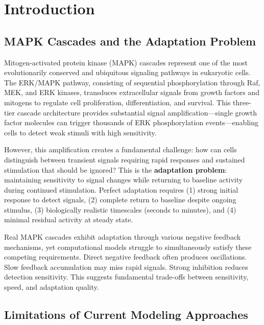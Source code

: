 \documentclass[twocolumn,11pt]{article}
\newcommand{\erk}{ERK}
\newcommand{\mapk}{MAPK}
\begin{document}
\section{Introduction}

\subsection{MAPK Cascades and the Adaptation Problem}

Mitogen-activated protein kinase (\mapk{}) cascades represent one of the most evolutionarily conserved and ubiquitous signaling pathways in eukaryotic cells. The \erk{}/\mapk{} pathway, consisting of sequential phosphorylation through Raf, MEK, and \erk{} kinases, transduces extracellular signals from growth factors and mitogens to regulate cell proliferation, differentiation, and survival. This three-tier cascade architecture provides substantial signal amplification---single growth factor molecules can trigger thousands of \erk{} phosphorylation events---enabling cells to detect weak stimuli with high sensitivity.

However, this amplification creates a fundamental challenge: how can cells distinguish between transient signals requiring rapid responses and sustained stimulation that should be ignored? This is the \textbf{adaptation problem}: maintaining sensitivity to signal changes while returning to baseline activity during continued stimulation. Perfect adaptation requires (1) strong initial response to detect signals, (2) complete return to baseline despite ongoing stimulus, (3) biologically realistic timescales (seconds to minutes), and (4) minimal residual activity at steady state.

Real \mapk{} cascades exhibit adaptation through various negative feedback mechanisms, yet computational models struggle to simultaneously satisfy these competing requirements. Direct negative feedback often produces oscillations. Slow feedback accumulation may miss rapid signals. Strong inhibition reduces detection sensitivity. This suggests fundamental trade-offs between sensitivity, speed, and adaptation quality.

\subsection{Limitations of Current Modeling Approaches}
\end{document}
